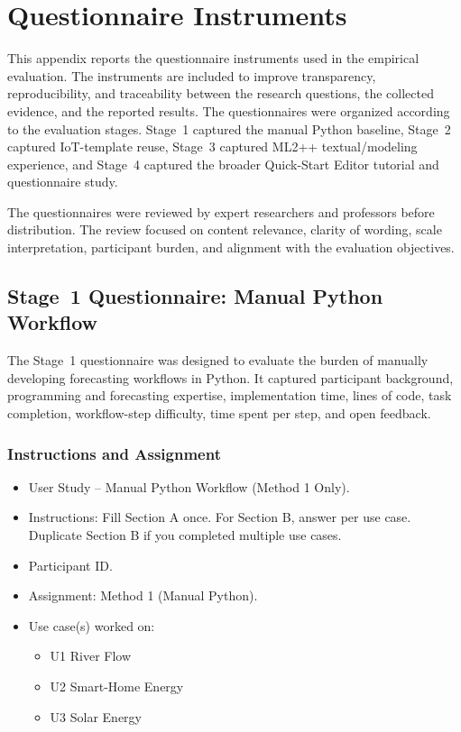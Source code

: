 
\chapter{Questionnaire Instruments}
\label{app:questionnaire_instruments}

This appendix reports the questionnaire instruments used in the empirical evaluation. The instruments are included to improve transparency, reproducibility, and traceability between the research questions, the collected evidence, and the reported results. The questionnaires were organized according to the evaluation stages. Stage~1 captured the manual Python baseline, Stage~2 captured IoT-template reuse, Stage~3 captured ML2++ textual/modeling experience, and Stage~4 captured the broader Quick-Start Editor tutorial and questionnaire study.

The questionnaires were reviewed by expert researchers and professors before distribution. The review focused on content relevance, clarity of wording, scale interpretation, participant burden, and alignment with the evaluation objectives.

\section{Stage~1 Questionnaire: Manual Python Workflow}
\label{app:stage1_questionnaire}

The Stage~1 questionnaire was designed to evaluate the burden of manually developing forecasting workflows in Python. It captured participant background, programming and forecasting expertise, implementation time, lines of code, task completion, workflow-step difficulty, time spent per step, and open feedback.

\subsection{Instructions and Assignment}
\label{app:stage1_instructions}

\begin{itemize}[leftmargin=*]
    \item User Study -- Manual Python Workflow (Method 1 Only).
    \item Instructions: Fill Section A once. For Section B, answer per use case. Duplicate Section B if you completed multiple use cases.
    \item Participant ID.
    \item Assignment: Method 1 (Manual Python).
    \item Use case(s) worked on:
    \begin{itemize}
        \item U1 River Flow
        \item U2 Smart-Home Energy
        \item U3 Solar Energy
    \end{itemize}
\end{itemize}

